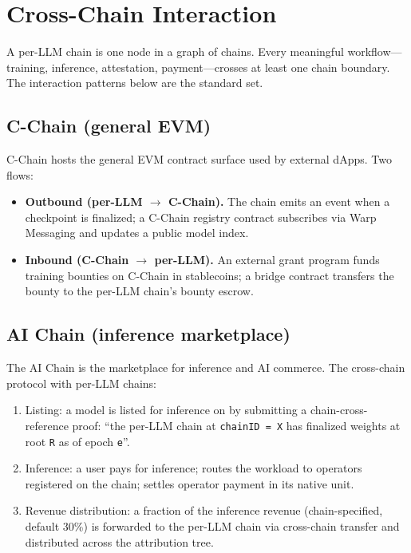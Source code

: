 \section{Cross-Chain Interaction}
\label{sec:crosschain}

A per-LLM chain is one node in a graph of chains. Every meaningful workflow---training, inference, attestation, payment---crosses at least one chain boundary. The interaction patterns below are the standard set.

\subsection{\Lux{} C-Chain (general EVM)}

C-Chain hosts the general EVM contract surface used by external dApps. Two flows:
\begin{itemize}[nosep]
\item \textbf{Outbound (per-LLM $\to$ C-Chain).} The chain emits an event when a checkpoint is finalized; a C-Chain registry contract subscribes via Warp Messaging and updates a public model index.
\item \textbf{Inbound (C-Chain $\to$ per-LLM).} An external grant program funds training bounties on C-Chain in stablecoins; a bridge contract transfers the bounty to the per-LLM chain's bounty escrow.
\end{itemize}

\subsection{\Hanzo{} AI Chain (inference marketplace)}

The \Hanzo{} AI Chain is the marketplace for inference and AI commerce. The cross-chain protocol with per-LLM chains:

\begin{enumerate}[nosep]
\item Listing: a model is listed for inference on \Hanzo{} by submitting a chain-cross-reference proof: ``the per-LLM chain at \texttt{chainID = X} has finalized weights at root \texttt{R} as of epoch \texttt{e}''.
\item Inference: a user pays \Hanzo{} for inference; \Hanzo{} routes the workload to operators registered on the \Zen{} chain; \Hanzo{} settles operator payment in its native unit.
\item Revenue distribution: a fraction of the inference revenue (chain-specified, default 30\%) is forwarded to the per-LLM chain via cross-chain transfer and distributed across the attribution tree.
\end{enumerate}

